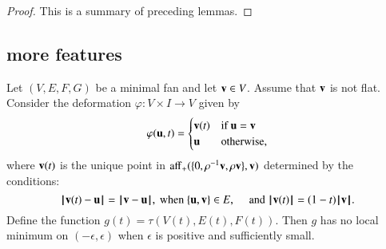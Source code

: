 \begin{proof} This is a summary of preceding lemmas.
\end{proof}
%


\subsection{more features}





\begin{lemma} 
Let $(V,E,F,G)$ be a minimal fan and let $\v\in V$.  Assume that $\v$ is not flat.
Consider the deformation $\varphi:V\times I\to V$ given by
$$
\varphi(\u,t) =
\begin{cases}
\v(t) & \text{if } \u=\v\\
\u & \text{otherwise},\\
\end{cases}
$$
where $\v(t)$ is the unique point in $\op{aff}_+(\{0,\rho^{-1}\v,\rho \v\},\v)$ determined by the conditions:
$$
\norm{\v(t)}{\u} = \norm{\v}{\u}, \text{~when~} \{\u,\v\}\in E,\quad
\text{~and~}
\normo{\v(t)} = (1-t)\normo{\v}.
$$
Define the function
$g(t)=\tau(V(t),E(t),F(t))$.
Then 
 $g$ has no local minimum on $(-\epsilon,\epsilon)$ when $\epsilon$ is positive and sufficiently small.
%
%
\end{lemma}


